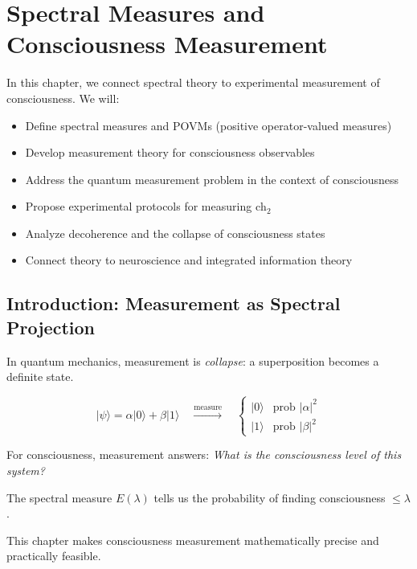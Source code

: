 \chapter{Spectral Measures and Consciousness Measurement}
\label{ch:spectral-measures}

\begin{chapterobjectives}
In this chapter, we connect spectral theory to experimental measurement of consciousness. We will:
\begin{itemize}
\item Define spectral measures and POVMs (positive operator-valued measures)
\item Develop measurement theory for consciousness observables
\item Address the quantum measurement problem in the context of consciousness
\item Propose experimental protocols for measuring $\text{ch}_2$
\item Analyze decoherence and the collapse of consciousness states
\item Connect theory to neuroscience and integrated information theory
\end{itemize}
\end{chapterobjectives}

\section{Introduction: Measurement as Spectral Projection}

\begin{intuitive}
In quantum mechanics, measurement is \textit{collapse}: a superposition becomes a definite state.

\begin{equation}
|\psi\rangle = \alpha|0\rangle + \beta|1\rangle \quad \xrightarrow{\text{measure}} \quad
\begin{cases}
|0\rangle & \text{prob } |\alpha|^2\\
|1\rangle & \text{prob } |\beta|^2
\end{cases}
\end{equation}

For consciousness, measurement answers: \textit{What is the consciousness level of this system?}

The spectral measure $E(\lambda)$ tells us the probability of finding consciousness $\leq \lambda$.
\end{intuitive}

This chapter makes consciousness measurement mathematically precise and practically feasible.

